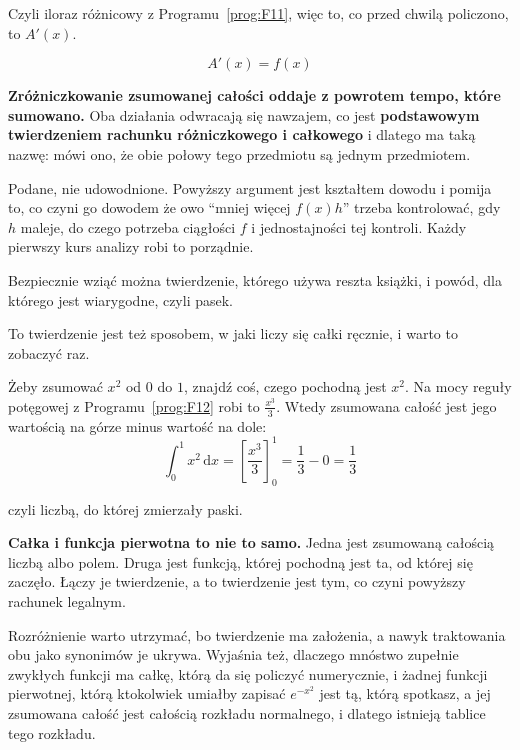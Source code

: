\begin{fr}
Czyli iloraz różnicowy z Programu~\ref{prog:F11}, więc to, co przed chwilą
policzono, to $A'(x)$.

\[ A'(x) = f(x) \]

\textbf{Zróżniczkowanie zsumowanej całości oddaje z powrotem tempo, które
sumowano.} Oba działania odwracają się nawzajem, co jest \textbf{podstawowym
twierdzeniem rachunku różniczkowego i całkowego} i dlatego ma taką nazwę: mówi
ono, że obie połowy tego przedmiotu są jednym przedmiotem.

\begin{rigourbox}
Podane, nie udowodnione. Powyższy argument jest kształtem dowodu i pomija to,
co czyni go dowodem \dash{} że owo \enquote{mniej więcej $f(x)h$} trzeba
kontrolować, gdy $h$ maleje, do czego potrzeba ciągłości $f$ i jednostajności
tej kontroli. Każdy pierwszy kurs analizy robi to porządnie.

Bezpiecznie wziąć można twierdzenie, którego używa reszta książki, i powód,
dla którego jest wiarygodne, czyli pasek.
\end{rigourbox}
\end{fr}

\begin{fr}
To twierdzenie jest też sposobem, w jaki liczy się całki ręcznie, i warto to
zobaczyć raz.

Żeby zsumować $x^{2}$ od $0$ do $1$, znajdź coś, czego pochodną jest $x^{2}$.
Na mocy reguły potęgowej z Programu~\ref{prog:F12} robi to
$\frac{x^{3}}{3}$. Wtedy zsumowana całość jest jego wartością na górze minus
wartość na dole:
\[ \int_{0}^{1} x^{2}\,\mathrm{d}x
   = \left[\frac{x^{3}}{3}\right]_{0}^{1} = \frac{1}{3} - 0 = \frac{1}{3} \]

czyli liczbą, do której zmierzały paski.

\begin{trapbox}
\textbf{Całka i funkcja pierwotna to nie to samo.} Jedna jest zsumowaną
całością \dash{} liczbą albo polem. Druga jest funkcją, której pochodną jest
ta, od której się zaczęło. Łączy je twierdzenie, a to twierdzenie jest tym, co
czyni powyższy rachunek legalnym.

Rozróżnienie warto utrzymać, bo twierdzenie ma założenia, a nawyk traktowania
obu jako synonimów je ukrywa. Wyjaśnia też, dlaczego mnóstwo zupełnie zwykłych
funkcji ma całkę, którą da się policzyć numerycznie, i żadnej funkcji
pierwotnej, którą ktokolwiek umiałby zapisać \dash{} $e^{-x^{2}}$ jest tą,
którą spotkasz, a jej zsumowana całość jest całością rozkładu normalnego, i
dlatego istnieją tablice tego rozkładu.
\end{trapbox}
\end{fr}

